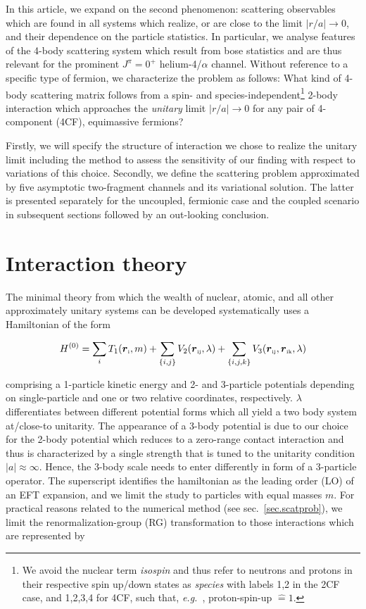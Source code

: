 \documentclass[aps,twocolumn,preprintnumbers,amsmath,amssymb,nofootinbib,superscriptaddress,notitlepage]{revtex4-1}
\newcommand{\eg}{\textit{e.g.}~}
\newcommand{\be}{\begin{equation}}
\newcommand{\ee}{\end{equation}}
\newcommand{\vsp}[1]{\ensuremath{\boldsymbol{r}}_\text{\tiny #1}}
\newcommand{\la}{\label}
\newcommand{\secref}[1]{sec.~\ref{#1}}
\begin{document}
In this article, we expand on the second phenomenon: scattering observables which are found in all
systems which realize, or are close to the limit $\vert r/a\vert\to 0$, and their dependence on the
particle statistics. In particular, we analyse features of the 4-body scattering system which result
from bose statistics and are thus relevant for the prominent $J^\pi=0^+$ helium-4/$\alpha$ channel. Without reference
to a specific type of fermion, we characterize the problem as follows: What kind of 4-body scattering matrix follows
from a spin- and species-independent\footnote{We avoid the nuclear term {\it isospin} and thus refer to neutrons
and protons in their respective spin up/down states as {\it species} with labels 1,2 in the 2CF case, and 1,2,3,4
for 4CF, such that, \eg, proton-spin-up $\hat{=}1$.} 2-body interaction which approaches the
{\it unitary} limit $\vert r/a\vert\to 0$ for any pair of 4-component (4CF), equimassive fermions?

Firstly, we will specify the structure of interaction we chose to realize the unitary limit including the method
to assess the sensitivity of our finding with respect to variations of this choice. Secondly, we define the
scattering problem approximated by five asymptotic two-fragment channels and its variational solution. The latter
is presented separately for the uncoupled, fermionic case and the coupled scenario in subsequent sections followed by
an out-looking conclusion.

 
\section{Interaction theory}

The minimal theory from which the wealth of nuclear, atomic, and all other approximately unitary systems can be developed
systematically uses a Hamiltonian of the form

\be\la{eq.ham}
H^{(0)}
=
\sum_iT_1(\vsp{i},m)
+
\sum_{\lbrace i,j\rbrace}V_2(\vsp{ij},\lambda)
+
\sum_{\lbrace i,j,k\rbrace}V_3(\vsp{ij},\vsp{ik},\lambda)
\ee 

comprising a 1-particle kinetic energy and 2- and 3-particle potentials
depending on single-particle and one or two relative coordinates, respectively.
$\lambda$ differentiates between different potential forms which all yield
a two body system at/close-to unitarity.
The appearance of a 3-body potential is due to our choice for the 2-body
potential which reduces to a zero-range contact interaction and thus is characterized
by a single strength that is tuned to the unitarity condition $\vert a\vert\approx\infty$.
Hence, the 3-body scale needs to enter differently in form of a 3-particle operator.
The superscript identifies the hamiltonian as the leading order (LO) of an EFT expansion,
and we limit the study to particles with equal masses $m$.
For practical reasons related to the numerical method (see \secref{sec.scatprob}), we limit
the renormalization-group (RG) transformation to those interactions which are represented by
\end{document}
